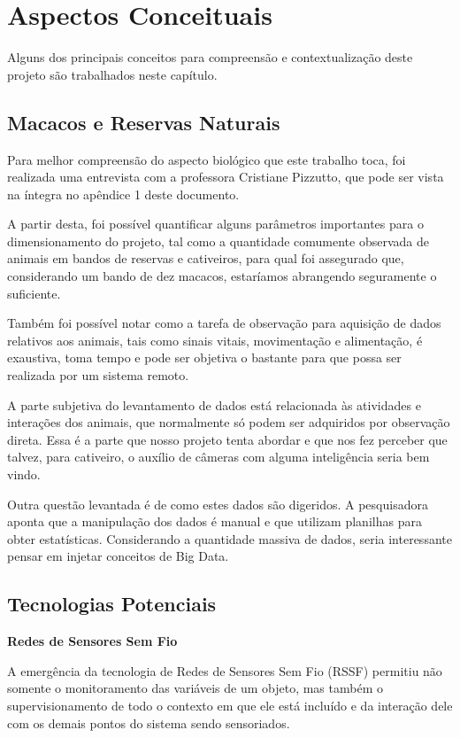 \chapter{Aspectos Conceituais}
Alguns dos principais conceitos para compreensão e contextualização deste projeto são trabalhados neste capítulo.

\section{Macacos e Reservas Naturais}
Para melhor compreensão do aspecto biológico que este trabalho toca, foi realizada uma entrevista com a professora Cristiane Pizzutto, que pode ser vista na íntegra no apêndice 1 deste documento.

A partir desta, foi possível quantificar alguns parâmetros importantes para o dimensionamento do projeto, tal como a quantidade comumente observada de animais em bandos de reservas e cativeiros, para qual foi assegurado que, considerando um bando de dez macacos, estaríamos abrangendo seguramente o suficiente.

Também foi possível notar como a tarefa de observação para aquisição de dados relativos aos animais, tais como sinais vitais, movimentação e alimentação, é exaustiva, toma tempo e pode ser objetiva o bastante para que possa ser realizada por um sistema remoto.

A parte subjetiva do levantamento de dados está relacionada às atividades e interações dos animais, que normalmente só podem ser adquiridos por observação direta. Essa é a parte que nosso projeto tenta abordar e que nos fez perceber que talvez, para cativeiro, o auxílio de câmeras com alguma inteligência seria bem vindo.

Outra questão levantada é de como estes dados são digeridos. A pesquisadora aponta que a manipulação dos dados é manual e que utilizam planilhas para obter estatísticas. Considerando a quantidade massiva de dados, seria interessante pensar em injetar conceitos de Big Data.

\section{Tecnologias Potenciais}
\textbf{Redes de Sensores Sem Fio}

A emergência da tecnologia de Redes de Sensores Sem Fio (RSSF) permitiu não somente o monitoramento das variáveis de um objeto, mas também o supervisionamento de todo o contexto em que ele está incluído e da interação dele com os demais pontos do sistema sendo sensoriados.

